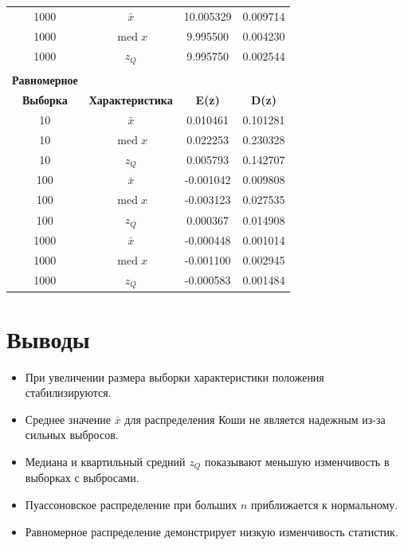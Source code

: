 \documentclass[a4paper]{article}
\begin{document}
\begin{table}[!htbp]
{\begin{tabular}{|c|c|c|c|}
                1000             & $\bar{x}$               & 10.005329     & 0.009714      \\
                1000             & $\operatorname{med} x$  & 9.995500      & 0.004230      \\
                1000             & $z_Q$                   & 9.995750      & 0.002544      \\
                \hline \\
                \multicolumn{1}{|c|}{\textbf{Равномерное}} \\
                \hline
                \textbf{Выборка} & \textbf{Характеристика} & \textbf{E(z)} & \textbf{D(z)} \\
                \hline
                10               & $\bar{x}$               & 0.010461      & 0.101281      \\
                10               & $\operatorname{med} x$  & 0.022253      & 0.230328      \\
                10               & $z_Q$                   & 0.005793      & 0.142707      \\            \hline

                100              & $\bar{x}$               & -0.001042     & 0.009808      \\
                100              & $\operatorname{med} x$  & -0.003123     & 0.027535      \\
                100              & $z_Q$                   & 0.000367      & 0.014908      \\            \hline

                1000             & $\bar{x}$               & -0.000448     & 0.001014      \\
                1000             & $\operatorname{med} x$  & -0.001100     & 0.002945      \\
                1000             & $z_Q$                   & -0.000583     & 0.001484      \\
                \hline
            \end{tabular}
        }
        \label{tab:table}
    \end{table}


    \section{Выводы}\label{sec:}
    \begin{itemize}
        \item При увеличении размера выборки характеристики положения стабилизируются.
        \item Среднее значение $\bar{x}$ для распределения Коши не является надежным из-за сильных выбросов.
        \item Медиана и квартильный средний $z_Q$ показывают меньшую изменчивость в выборках с выбросами.
        \item Пуассоновское распределение при больших $n$ приближается к нормальному.
        \item Равномерное распределение демонстрирует низкую изменчивость статистик.
    \end{itemize}
\end{document}
